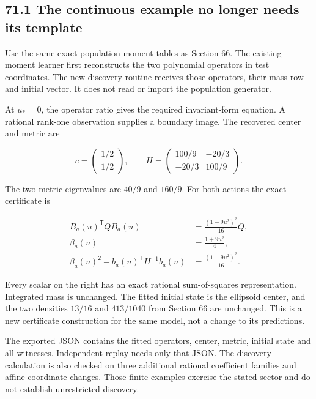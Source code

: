\subsection{71.1 The continuous example no longer needs its
template}\label{LSM:the-continuous-example-no-longer-needs-its-template}

Use the same exact population moment tables as Section 66. The existing
moment learner first reconstructs the two polynomial operators in test
coordinates. The new discovery routine receives those operators, their
mass row and initial vector. It does not read
 or import the population generator.

At \(u_*=0\), the operator ratio gives the required invariant-form
equation. A rational rank-one observation supplies a boundary image. The
recovered center and metric are

\[
\boxed{
c=\begin{pmatrix}1/2\\1/2\end{pmatrix},\qquad
H=\begin{pmatrix}100/9&-20/3\\-20/3&100/9\end{pmatrix}.
}
\]

The two metric eigenvalues are \(40/9\) and \(160/9\). For both actions
the exact certificate is

\[
\begin{aligned}
B_a(u)^{\mathsf T}QB_a(u)&=\frac{(1-9u^2)^2}{16}Q,\\
\beta_a(u)&=\frac{1+9u^2}{4},\\
\beta_a(u)^2-b_a(u)^{\mathsf T}H^{-1}b_a(u)
&=\frac{(1-9u^2)^2}{16}.
\end{aligned}
\]

Every scalar on the right has an exact rational sum-of-squares
representation. Integrated mass is unchanged. The fitted initial state
is the ellipsoid center, and the two densities \(13/16\) and
\(413/1040\) from Section 66 are unchanged. This is a new certificate
construction for the same model, not a change to its predictions.

The exported JSON contains the fitted operators, center, metric, initial
state and all witnesses. Independent replay needs only that JSON. The
discovery calculation is also checked on three additional rational
coefficient families and affine coordinate changes. Those finite
examples exercise the stated sector and do not establish unrestricted
discovery.

